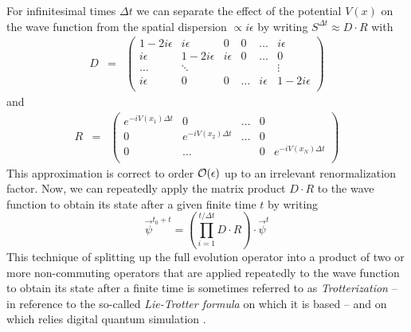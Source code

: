 %
For infinitesimal times $\Delta t$ we can separate the effect of the potential $V(x)$ on the wave function from the spatial dispersion $\propto i\epsilon$ by writing $S^{\Delta t} \approx D\cdot R$ with 
%
\begin{eqnarray}
D & = & \left( 
		\begin{array}{cccccc}
		1-2i \epsilon & i\epsilon & 0 & 0 & \hdots & i\epsilon \\
		i \epsilon & 1 - 2i \epsilon & i \epsilon & 0 & \hdots & 0 \\
		\hdots & \ddots & & & & \vdots \\
		i \epsilon & 0 & 0 &  \hdots & i\epsilon & 1-2i \epsilon \\
		\end{array}
	\right)
\end{eqnarray}
%
and 
%
\begin{eqnarray}
R & = & \left( \begin{array}{ccccc}
	e^{-i V(x_1) \Delta t} & 0 & \hdots & 0 \\
	0 & e^{-i V (x_2) \Delta t} & \hdots & 0 \\
	0 & \hdots & & 0 & e^{-i V (x_N) \Delta t} \\
	\end{array}
	\right)
\end{eqnarray}
%
This approximation is correct to order $\begin{mathcal}O\end{mathcal}(\epsilon)$ up to an irrelevant renormalization factor. Now, we can repeatedly apply the matrix product $D\cdot R$ to the wave function to obtain its state after a given finite time $t$ by writing
%
\begin{equation}
\vec{\psi}^{t_0+t} = \left(\prod\limits_{i = 1}^{t/\Delta t} D\cdot R\right)\cdot \vec{\psi}^{t} \label{eq:trotter_evolution}
\end{equation}
%
This technique of splitting up the full evolution operator into a product of two or more non-commuting operators that are applied repeatedly to the wave function to obtain its state after a finite time is sometimes referred to as {\it Trotterization} -- in reference to the so-called {\it Lie-Trotter formula} on which it is based -- and on which relies digital quantum simulation \citep{lloyd_universal_1996,lanyon_universal_2011}.

\smallskip

